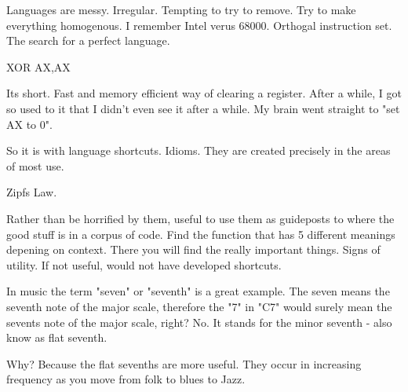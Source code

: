 Languages are messy. Irregular. Tempting to try to remove. Try to make everything homogenous.
I remember Intel verus 68000. Orthogal instruction set. The search for a perfect language.

	XOR AX,AX

Its short. Fast and memory efficient way of clearing a register. After a while, I got so used to it that I didn't even see it after a while. My brain went straight to "set AX to 0".

So it is with language shortcuts. Idioms. They are created precisely in the areas of most use.

Zipfs Law.

Rather than be horrified by them, useful to use them as guideposts to where the good stuff is in a corpus of code. Find the function that has 5 different meanings depening on context. There you will find the really important things. Signs of utility. If not useful, would not have developed shortcuts.

In music the term "seven" or "seventh" is a great example. The seven means the seventh note of the major scale, therefore the "7" in "C7" would surely mean the sevents note
of the major scale, right? No. It stands for the minor seventh - also know as flat seventh.

Why? Because the flat sevenths are more useful. They occur in increasing frequency as you move from folk to blues to Jazz.


